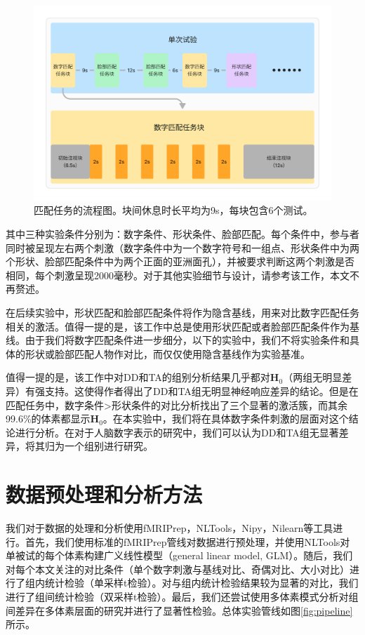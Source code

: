 \documentclass[bachelor, comfort]{shtthesis}
\begin{document}
\begin{figure}[ht]
	\centering
	\includegraphics[width=1.0\linewidth]{figures/trial.png}
	\caption{\label{fig:trial} 匹配任务的流程图。块间休息时长平均为9s，每块包含6个测试。}
\end{figure}

其中三种实验条件分别为：数字条件、形状条件、脸部匹配。每个条件中，参与者同时被呈现左右两个刺激（数字条件中为一个数字符号和一组点、形状条件中为两个形状、脸部匹配条件中为两个正面的亚洲面孔），并被要求判断这两个刺激是否相同，每个刺激呈现2000毫秒。对于其他实验细节与设计，请参考该工作\cite{num1}，本文不再赘述。

在后续实验中，形状匹配和脸部匹配条件将作为隐含基线，用来对比数字匹配任务相关的激活。值得一提的是，该工作中总是使用形状匹配或者脸部匹配条件作为基线。由于我们将数字匹配条件进一步细分，以下的实验中，我们不将实验条件和具体的形状或脸部匹配人物作对比，而仅仅使用隐含基线作为实验基准。

值得一提的是，该工作中对DD和TA的组别分析结果几乎都对$\mathbf{H}_0$（两组无明显差异）有强支持。这使得作者得出了DD和TA组无明显神经响应差异的结论。但是在匹配任务中，数字条件>形状条件的对比分析找出了三个显著的激活簇，而其余99.6\%的体素都显示$\mathbf{H}_0$。在本实验中，我们将在具体数字条件刺激的层面对这个结论进行分析。在对于人脑数字表示的研究中，我们可以认为DD和TA组无显著差异，将其归为一个组别进行研究。

\section{数据预处理和分析方法}
我们对于数据的处理和分析使用fMRIPrep\cite{num2}，NLTools\cite{nltools}，Nipy\cite{nipy}，Nilearn\cite{nilearn}等工具进行。首先，我们使用标准的fMRIPrep管线对数据进行预处理，并使用NLTools对单被试的每个体素构建广义线性模型（general linear model, GLM）。随后，我们对每个本文关注的对比条件（单个数字刺激与基线对比、奇偶对比、大小对比）进行了组内统计检验（单采样t检验）。对与组内统计检验结果较为显著的对比，我们进行了组间统计检验（双采样t检验）。最后，我们还尝试使用多体素模式分析对组间差异在多体素层面的研究并进行了显著性检验。总体实验管线如图\ref{fig:pipeline}所示。
\end{document}

